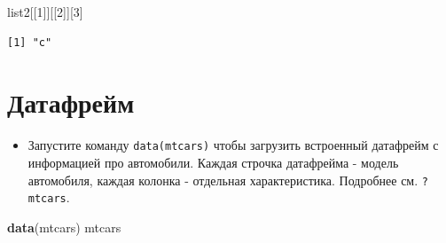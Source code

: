 \documentclass[
]{book}
\newenvironment{Shaded}{\begin{snugshade}}{\end{snugshade}}
\newcommand{\DecValTok}[1]{\textcolor[rgb]{0.00,0.00,0.81}{#1}}
\newcommand{\KeywordTok}[1]{\textcolor[rgb]{0.13,0.29,0.53}{\textbf{#1}}}
\newcommand{\NormalTok}[1]{#1}
\providecommand{\tightlist}{%
  \setlength{\itemsep}{0pt}\setlength{\parskip}{0pt}}
\begin{document}
\begin{Shaded}
\begin{Highlighting}[]
\NormalTok{list2[[}\DecValTok{1}\NormalTok{]][[}\DecValTok{2}\NormalTok{]][}\DecValTok{3}\NormalTok{]}
\end{Highlighting}
\end{Shaded}

\begin{verbatim}
[1] "c"
\end{verbatim}

\hypertarget{solution_df}{%
\section{Датафрейм}\label{solution_df}}

\begin{itemize}
\tightlist
\item
  Запустите команду \texttt{data(mtcars)} чтобы загрузить встроенный датафрейм с информацией про автомобили. Каждая строчка датафрейма - модель автомобиля, каждая колонка - отдельная характеристика. Подробнее см. \texttt{?mtcars}.
\end{itemize}

\begin{Shaded}
\begin{Highlighting}[]
\KeywordTok{data}\NormalTok{(mtcars)}
\NormalTok{mtcars}
\end{Highlighting}
\end{Shaded}
\end{document}
